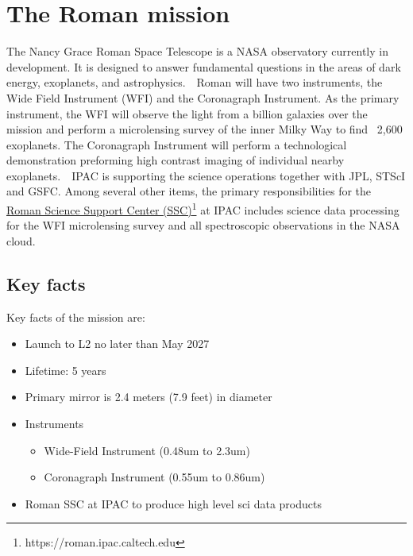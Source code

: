 \documentclass[11pt,twoside]{article}
\begin{document}


\section{The Roman mission}

The Nancy Grace Roman Space Telescope is a NASA observatory currently in development. It is designed to answer fundamental questions in the areas of dark energy, exoplanets, and astrophysics.  Roman will have two instruments, the Wide Field Instrument (WFI) and the Coronagraph Instrument. As the primary instrument, the WFI will observe the light from a billion galaxies over the mission and perform a microlensing survey of the inner Milky Way to find ~2,600 exoplanets. The Coronagraph Instrument will perform a technological demonstration preforming high contrast imaging of individual nearby exoplanets.  IPAC is supporting the science operations together with JPL, STScI and GSFC. Among several other items, the primary responsibilities for the \href{https://roman.ipac.caltech.edu}{Roman Science Support Center (SSC)\footnote{https://roman.ipac.caltech.edu}} at IPAC includes science data processing for the WFI microlensing survey and all spectroscopic observations in the NASA cloud.


\subsection{Key facts}

Key facts of the mission are:

\begin{itemize}
  \item Launch to L2 no later than May 2027
  \item Lifetime: 5 years
  \item Primary mirror is 2.4 meters (7.9 feet) in diameter
  \item Instruments
    \begin{itemize}
        \item Wide-Field Instrument (0.48um to 2.3um)
        \item Coronagraph Instrument (0.55um to 0.86um)
    \end{itemize}
  \item Roman SSC at IPAC to produce high level sci data products
\end{itemize}
\end{document}
